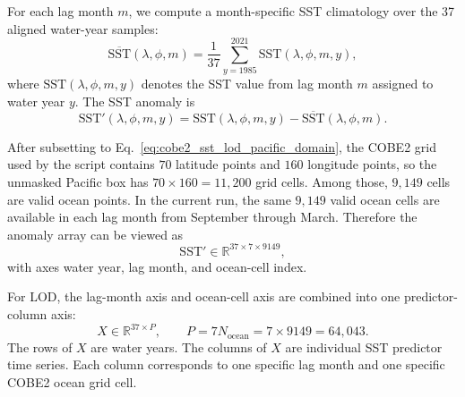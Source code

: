 \documentclass[11pt]{article}
\newcommand{\sst}{\mathrm{SST}}
\begin{document}
For each lag month $m$, we compute a month-specific SST climatology over the 37 aligned water-year
samples:
\begin{equation}
\overline{\sst}(\lambda,\phi,m)
=
\frac{1}{37}
\sum_{y=1985}^{2021}
\sst(\lambda,\phi,m,y),
\label{eq:sst_lod_monthly_climatology}
\end{equation}
where $\sst(\lambda,\phi,m,y)$ denotes the SST value from lag month $m$ assigned to water year $y$.
The SST anomaly is
\begin{equation}
\sst'(\lambda,\phi,m,y)
=
\sst(\lambda,\phi,m,y)
-
\overline{\sst}(\lambda,\phi,m).
\label{eq:sst_lod_anomaly}
\end{equation}

After subsetting to Eq.~\eqref{eq:cobe2_sst_lod_pacific_domain}, the COBE2 grid used by the script
contains $70$ latitude points and $160$ longitude points, so the unmasked Pacific box has
$70 \times 160 = 11{,}200$ grid cells. Among those, $9{,}149$ cells are valid ocean points. In the
current run, the same $9{,}149$ valid ocean cells are available in each lag month from September
through March. Therefore the anomaly array can be viewed as
\begin{equation}
\sst' \in \mathbb{R}^{37 \times 7 \times 9149},
\label{eq:sst_lod_ocean_only_dim}
\end{equation}
with axes water year, lag month, and ocean-cell index.

For LOD, the lag-month axis and ocean-cell axis are combined into one predictor-column axis:
\begin{equation}
X \in \mathbb{R}^{37 \times P},
\qquad
P = 7N_{\mathrm{ocean}} = 7 \times 9149 = 64{,}043.
\label{eq:sst_lod_flattened_dim}
\end{equation}
The rows of $X$ are water years. The columns of $X$ are individual SST predictor time series. Each
column corresponds to one specific lag month and one specific COBE2 ocean grid cell.
\end{document}
